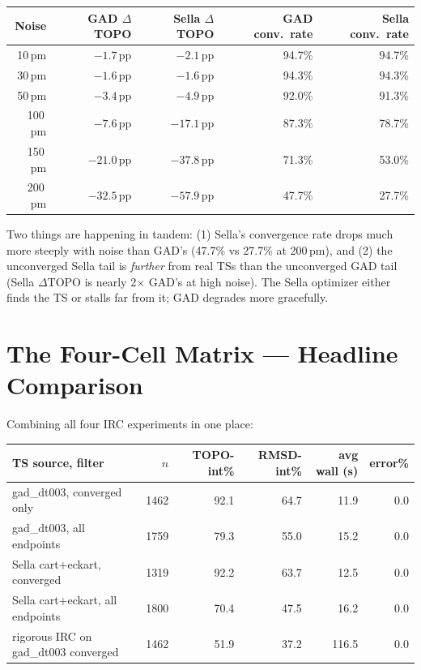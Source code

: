 \documentclass[11pt]{article}
\begin{document}
\begin{center}
\begin{tabular}{rrrrr}
\toprule
Noise & GAD $\Delta$TOPO & Sella $\Delta$TOPO & GAD conv.\ rate & Sella conv.\ rate \\
\midrule
10\,pm  & $-1.7$\,pp  & $-2.1$\,pp  & 94.7\% & 94.7\% \\
30\,pm  & $-1.6$\,pp  & $-1.6$\,pp  & 94.3\% & 94.3\% \\
50\,pm  & $-3.4$\,pp  & $-4.9$\,pp  & 92.0\% & 91.3\% \\
100\,pm & $-7.6$\,pp  & $-17.1$\,pp & 87.3\% & 78.7\% \\
150\,pm & $-21.0$\,pp & $-37.8$\,pp & 71.3\% & 53.0\% \\
200\,pm & $-32.5$\,pp & $-57.9$\,pp & 47.7\% & 27.7\% \\
\bottomrule
\end{tabular}
\end{center}

Two things are happening in tandem: (1) Sella's convergence rate drops
much more steeply with noise than GAD's (47.7\% vs 27.7\% at 200\,pm),
and (2) the unconverged Sella tail is \emph{further} from real TSs
than the unconverged GAD tail (Sella $\Delta$TOPO is nearly 2$\times$
GAD's at high noise). The Sella optimizer either finds the TS or stalls
far from it; GAD degrades more gracefully.

\section*{The Four-Cell Matrix --- Headline Comparison}

Combining all four IRC experiments in one place:

\begin{center}
\begin{tabular}{lrrrrr}
\toprule
TS source, filter & $n$ & TOPO-int\% & RMSD-int\% & avg wall (s) & error\% \\
\midrule
gad\_dt003, converged only   & 1462 & 92.1 & 64.7 & 11.9 & 0.0 \\
gad\_dt003, all endpoints    & 1759 & 79.3 & 55.0 & 15.2 & 0.0 \\
Sella cart+eckart, converged & 1319 & 92.2 & 63.7 & 12.5 & 0.0 \\
Sella cart+eckart, all endpoints & 1800 & 70.4 & 47.5 & 16.2 & 0.0 \\
\midrule
rigorous IRC on gad\_dt003 converged & 1462 & 51.9 & 37.2 & 116.5 & 0.0 \\
\bottomrule
\end{tabular}
\end{center}
\end{document}
